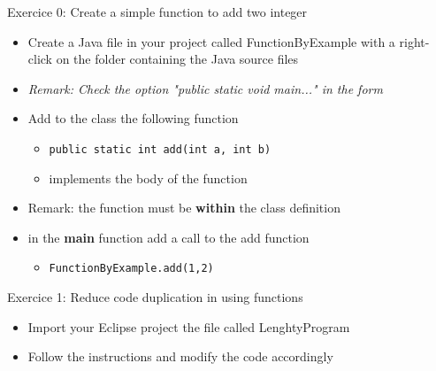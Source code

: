 {  \begin{frame}
    \begin{block}{Exercice 0: Create a simple function to add two integer}
      \begin{itemize}
        \item Create a Java file in your project called FunctionByExample with a right-click on the
        folder containing the Java source files
        \item \textit{Remark: Check the option "public static void main..." in the form}
        \item Add to the class the following function
        \begin{itemize}
          \item \texttt{public static int add(int a, int b)}
          \item implements the body of the function
        \end{itemize}
        \item Remark: the function must be \textbf{within} the class definition
        \item in the \textbf{main} function add a call to the add function
        \begin{itemize}
          \item \texttt{FunctionByExample.add(1,2)}
        \end{itemize}
      \end{itemize}
    \end{block}
  \end{frame}

  \begin{frame}
    \begin{block}{Exercice 1: Reduce code duplication in using functions}
      \begin{itemize}
        \item Import your Eclipse project the file called LenghtyProgram
        \item Follow the instructions and modify the code accordingly
      \end{itemize}
    \end{block}
  \end{frame}
}

